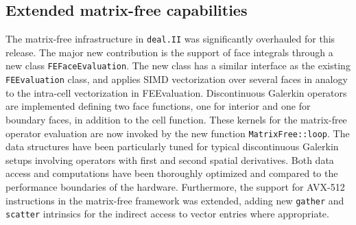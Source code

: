 \documentclass{ansarticle-preprint}
\newcommand{\specialword}[1]{\texttt{#1}}
\newcommand{\dealii}{{\specialword{deal.II}}\xspace}
\begin{document}
\subsection{Extended matrix-free capabilities}\label{sec:matrixfree}

The matrix-free infrastructure in \dealii{} was significantly overhauled for
this release. The major new contribution is the support of face
integrals through a new class \texttt{FEFaceEvaluation}. The new class has a
similar interface as the existing \texttt{FEEvaluation} class, and applies SIMD
vectorization over several faces in analogy to the intra-cell vectorization in
FEEvaluation. Discontinuous Galerkin operators are implemented defining two
face functions, one for interior and one for boundary faces, in addition to
the cell function. These kernels for the matrix-free operator evaluation are
now invoked by the new function \texttt{MatrixFree::loop}. The data
structures have been particularly tuned for typical discontinuous Galerkin
setups involving operators with first and second spatial derivatives. Both
data access and computations have been thoroughly optimized and compared to
the performance boundaries of the hardware. Furthermore, the support for
AVX-512 instructions in the matrix-free framework was extended, adding new
\texttt{gather} and \texttt{scatter} intrinsics for the indirect access to
vector entries where appropriate.
\end{document}
